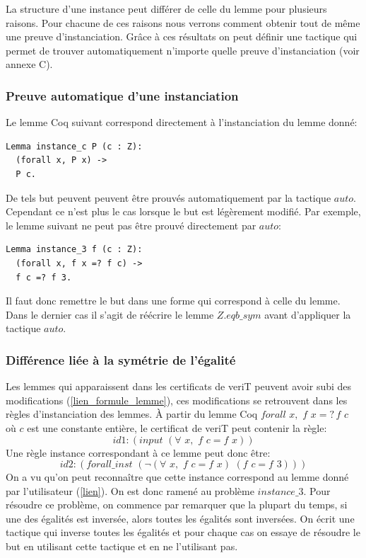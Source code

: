 \documentclass[11pt]{article}
\begin{document}
La structure d'une instance peut différer de celle du lemme pour plusieurs raisons. Pour chacune de ces raisons nous verrons comment obtenir tout de même une preuve d'instanciation. Grâce à ces résultats on peut définir une tactique qui permet de trouver automatiquement n'importe quelle preuve d'instanciation (voir annexe C).

\subsubsection{Preuve automatique d'une instanciation} \label{preuve_auto}

Le lemme Coq suivant correspond directement à l'instanciation du lemme donné:
\begin{lstlisting}[frame=single]
Lemma instance_c P (c : Z): 
  (forall x, P x) ->
  P c.
\end{lstlisting}

De tels but peuvent peuvent être prouvés automatiquement par la tactique $auto$. Cependant ce n'est plus le cas lorsque le but est légèrement modifié. Par exemple, le lemme suivant ne peut pas être prouvé directement par $auto$:

\begin{lstlisting}[frame=single]
Lemma instance_3 f (c : Z): 
  (forall x, f x =? f c) ->
  f c =? f 3.
\end{lstlisting}
Il faut donc remettre le but dans une forme qui correspond à celle du lemme. Dans le dernier cas il s'agit de réécrire le lemme $Z.eqb\_sym$ avant d'appliquer la tactique $auto$.

\subsubsection{Différence liée à la symétrie de l'égalité}

Les lemmes qui apparaissent dans les certificats de veriT peuvent avoir subi des modifications (\ref{lien_formule_lemme}), ces modifications se retrouvent dans les règles d'instanciation des lemmes. À partir du lemme Coq $forall\,\, x, \,\,f \,\,x =? \, f \,\,c$ où $c$ est une constante entière, le certificat de veriT peut contenir la règle:
\[id1: (input \,\,(\forall\,\, x, \,\,f \,\,c = f \,\,x))\]
Une règle instance correspondant à ce lemme peut donc être: 
\[id2:(forall\_inst\,\, (\neg (\forall \,\,x,\,\, f\,\, c = f \,\,x) \,\, (f\,\, c = f\,\, 3)))\]
On a vu qu'on peut reconnaître que cette instance correspond au lemme donné par l'utilisateur (\ref{lien}). On est donc ramené au problème $instance\_3$. Pour résoudre ce problème, on commence par remarquer que la plupart du temps, si une des égalités est inversée, alors toutes les égalités sont inversées. On écrit une tactique qui inverse toutes les égalités et pour chaque cas on essaye de résoudre le but en utilisant cette tactique et en ne l'utilisant pas.
\end{document}
